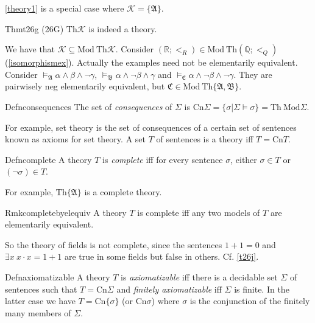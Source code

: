 \ref{theory1} is a special case where $\mathcal{K}=\{\mathfrak{A}\}.$

\begin{reference}{Thm}{t26g}
  (26G) $\mathrm{Th}\mathcal{K}$ is indeed a theory.
\end{reference}

We have that $\mathcal{K}\subseteq \mathrm{Mod\ Th}\mathcal{K}$. Consider $(\mathbb{R};<_R)\in \mathrm{Mod\ Th}(\mathbb{Q};<_Q)$ (\ref{isomorphismex}). Actually the examples need not be elementarily equivalent. Consider $\vDash_{\mathfrak{A}}\alpha\wedge \beta\wedge\neg \gamma$, $\vDash_{\mathfrak{B}}\alpha\wedge\neg\beta\wedge\gamma$ and $\vDash_{\mathfrak{C}}\alpha\wedge\neg\beta\wedge\neg\gamma$. They are pairwisely neg elementarily equivalent, but $\mathfrak{C}\in \mathrm{Mod\ Th}\{\mathfrak{A},\mathfrak{B}\}$.

\begin{reference}{Defn}{consequences}
  The set of \textit{consequences} of $\Sigma$ is $\mathrm{Cn}\Sigma=\{\sigma|\Sigma\vDash \sigma\}=\mathrm{Th\ Mod}\Sigma$.
\end{reference}

For example, set theory is the set of consequences of a certain set of sentences known as axioms for set theory. A set $T$ of sentences is a theory iff $T=\mathrm{Cn}T$.

\begin{reference}{Defn}{complete}
  A theory $T$ is \textit{complete} iff for every sentence $\sigma$, either $\sigma\in T$ or $(\neg \sigma)\in T$.
\end{reference}

For example, $\mathrm{Th}\{\mathfrak{A}\}$ is a complete theory.

\begin{reference}{Rmk}{completebyelequiv}
  A theory $T$ is complete iff any two models of $T$ are elementarily equivalent.
\end{reference}

So the theory of fields is not complete, since the sentences $1+1=0$ and $\exists x\ x\cdot x=1+1$ are true in some fields but false in others. Cf. \ref{t26j}.

\begin{reference}{Defn}{axiomatizable}
  A theory $T$ is \textit{axiomatizable} iff there is a decidable set $\Sigma$ of sentences such that $T=\mathrm{Cn}\Sigma$ and \textit{finitely axiomatizable} iff $\Sigma$ is finite. In the latter case we have $T=\mathrm{Cn}\{\sigma\}$ (or $\mathrm{Cn}\sigma$) where $\sigma$ is the conjunction of the finitely many members of $\Sigma$.
\end{reference}

